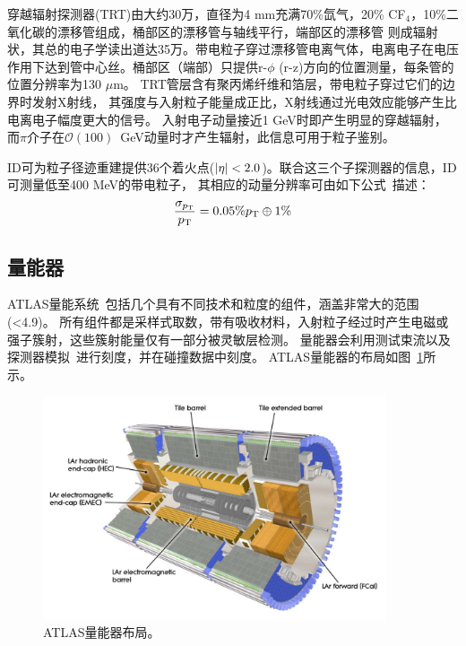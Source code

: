 穿越辐射探测器(TRT)由大约30万，直径为4 mm充满70\%氙气，20\% CF$_4$，10\%二氧化碳的漂移管组成，桶部区的漂移管与轴线平行，端部区的漂移管
则成辐射状，其总的电子学读出道达35万。带电粒子穿过漂移管电离气体，电离电子在电压作用下达到管中心丝。桶部区（端部）只提供r-$\phi$ (r-z)方向的位置测量，每条管的位置分辨率为130 $\mu\text{m}$。
TRT管层含有聚丙烯纤维和箔层，带电粒子穿过它们的边界时发射X射线，
其强度与入射粒子能量成正比，X射线通过光电效应能够产生比电离电子幅度更大的信号。
入射电子动量接近1 GeV时即产生明显的穿越辐射，而$\pi$介子在$\mathcal{O}(100)$~GeV动量时才产生辐射，此信息可用于粒子鉴别。

ID可为粒子径迹重建提供36个着火点($|\eta| < 2.0$)。联合这三个子探测器的信息，ID可测量\pt 低至400 MeV的带电粒子，
其相应的动量分辨率可由如下公式~\cite{ATLAS_Collaboration_2008}描述：
\begin{equation}
 \frac{\sigma_{p_{\text{T}}}}{p_{\text{T}}}=0.05\%p_{\text{T}}\oplus1\%
\end{equation}

\subsection{量能器}
ATLAS量能系统~\cite{ATLAS_Collaboration_2008}包括几个具有不同技术和粒度的组件，涵盖非常大的范围(\abseta <4.9)。 所有组件都是采样式取数，带有吸收材料，入射粒子经过时产生电磁或强子簇射，这些簇射能量仅有一部分被灵敏层检测。 量能器会利用测试束流以及探测器模拟~\cite{4436305,Davidek_2009}进行刻度，并在碰撞数据中刻度。 
ATLAS量能器的布局如图~\ref{fig:Calorimeter_d3}所示。
\begin{figure}[h]
\begin{center}
\includegraphics[width=0.9\textwidth]{fig/Calorimeter_d3.pdf}
\caption{ATLAS量能器布局。} \label{fig:Calorimeter_d3}
\end{center}
\end{figure}

